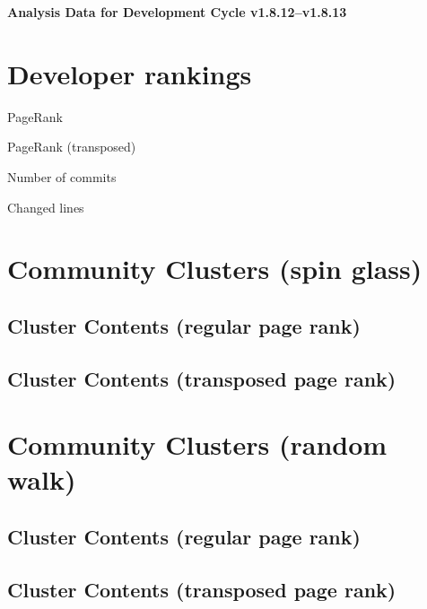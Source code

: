 \documentclass{article}
\begin{document}
\setlength{\parindent}{0pt}
\begin{center}
\begin{Large}
\textbf{Analysis Data for Development Cycle v1.8.12--v1.8.13}
\end{Large}
\end{center}
\section{Developer rankings}
\begin{small}\renewcommand{\tabcolsep}{1pt}
\begin{minipage}{0.5\linewidth}
PageRank\\

\end{minipage}%
\begin{minipage}{0.5\linewidth}
PageRank (transposed)\\

\end{minipage}

\renewcommand{\tabcolsep}{5pt}
\begin{minipage}{0.5\linewidth}
Number of commits\\

\end{minipage}%
\begin{minipage}{0.5\linewidth}
Changed lines\\

\end{minipage}
\end{small}
\newpage\section{Community Clusters (spin glass)}
\subsection{Cluster Contents (regular page rank)}
\newpage\subsection{Cluster Contents (transposed page rank)}
\newpage\section{Community Clusters (random walk)}
\subsection{Cluster Contents (regular page rank)}
\newpage\subsection{Cluster Contents (transposed page rank)}
\end{document}
